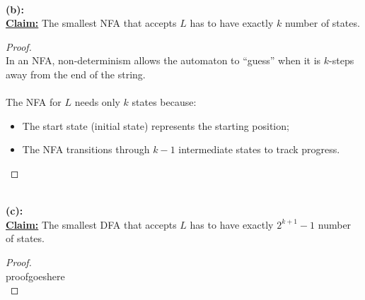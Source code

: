 \documentclass[12pt]{article}
\begin{document}
\leavevmode\\
\textbf{(b):} \\
\textbf{\underline{Claim:}} The smallest NFA that accepts $L$ has to have exactly $k$ number of states.
\begin{proof}
\leavevmode\\
    In an NFA, non-determinism allows the automaton to ``guess'' when it is $k$-steps away from the end of the string. \\
    \\
    The NFA for $L$ needs only $k$ states because:
    \begin{itemize}
    \item The start state (initial state) represents the starting position;
    \item The NFA transitions through $k - 1$ intermediate states to track progress. \\
    \end{itemize}
\end{proof}
\leavevmode\\
\textbf{(c):} \\
\textbf{\underline{Claim:}} The smallest DFA that accepts $L$ has to have exactly $2^{k + 1} - 1$ number of states.
\begin{proof}
\leavevmode\\
    proofgoeshere \\
\end{proof}
\leavevmode\\
\pagebreak
\end{document}

